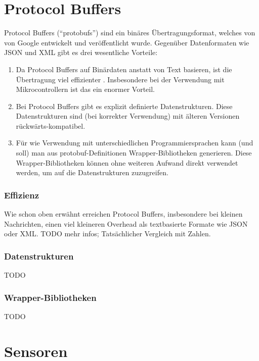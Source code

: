 \section{Protocol Buffers}
\label{subsec:ueberblick_protobufs}
Protocol Buffers \cite{protobufs} (``protobufs'') sind ein binäres Übertragungsformat,
welches von von Google entwickelt und veröffentlicht wurde.
%
Gegenüber Datenformaten wie JSON und XML gibt es drei wesentliche Vorteile:
\begin{enumerate}
    \item Da Protocol Buffers auf Binärdaten anstatt von Text basieren,
    ist die Übertragung viel effizienter \cite{7765670}.
    Insbesondere bei der Verwendung mit Mikrocontrollern ist das ein enormer Vorteil.

    \item Bei Protocol Buffers gibt es explizit definierte Datenstrukturen.
    Diese Datenstrukturen sind (bei korrekter Verwendung) mit älteren Versionen rückwärts-kompatibel.

    \item Für wie Verwendung mit unterschiedlichen Programmiersprachen kann (und soll) man aus protobuf-Definitionen
    Wrapper-Bibliotheken generieren.
    Diese Wrapper-Bibliotheken können ohne weiteren Aufwand direkt verwendet werden,
    um auf die Datenstrukturen zuzugreifen.
\end{enumerate}

\subsubsection{Effizienz}
Wie schon oben erwähnt erreichen Protocol Buffers,
insbesondere bei kleinen Nachrichten,
einen viel kleineren Overhead als textbasierte Formate wie JSON oder XML.
%
TODO mehr infos; Tatsächlicher Vergleich mit Zahlen.


\subsubsection{Datenstrukturen}
TODO

\subsubsection{Wrapper-Bibliotheken}
TODO

\section{Sensoren}
\label{subsec:ueberblick_sensors}

